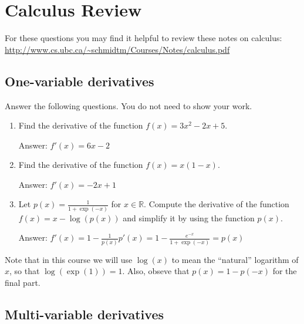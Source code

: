 \documentclass{article}
\def\ans#1{\par\gre{Answer: #1}}
\def\blu#1{{\color{blu}#1}}
\def\gre#1{{\color{gre}#1}}
\def\R{\mathbb{R}}
\begin{document}
\section{Calculus Review}

For these questions you may find it helpful to review these notes on calculus:\\
\url{http://www.cs.ubc.ca/~schmidtm/Courses/Notes/calculus.pdf}\\


\subsection{One-variable derivatives}

\blu{Answer the following questions.} You do not need to show your work.

\begin{enumerate}
\item Find the derivative of the function $f(x) = 3x^2 -2x + 5$.
\ans{$f'(x) = 6x - 2$}
\item Find the derivative of the function $f(x) = x(1-x)$.
\ans{$f'(x) = -2x + 1$}
\item Let $p(x) = \frac{1}{1+\exp(-x)}$ for $x \in \R$. Compute the derivative of the function $f(x) = x-\log(p(x))$ and simplify it by using the function $p(x)$.
\ans{$f'(x) = 1 - \frac{1}{p(x)} p'(x) = 1-\frac{e^{-x}}{1+\exp(-x)} = p(x)$}
\end{enumerate}
Note that in this course we will use $\log(x)$ to mean the ``natural'' logarithm of $x$, so that $\log(\exp(1)) = 1$. Also, obseve that $p(x) = 1-p(-x)$ for the final part.

\subsection{Multi-variable derivatives}
\end{document}
